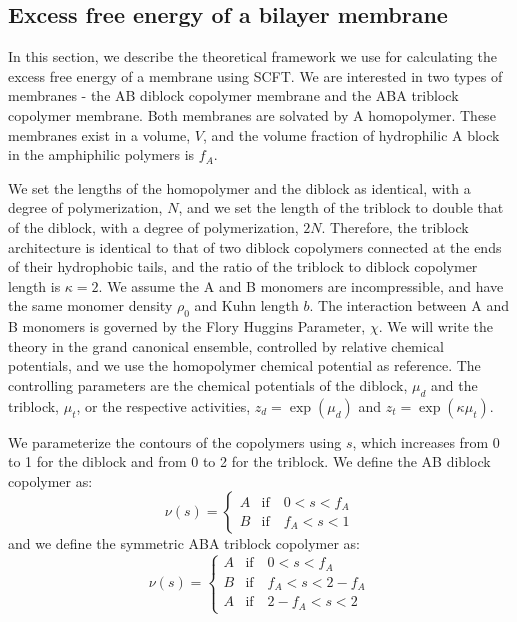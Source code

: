 \documentclass[twocolumn,aps,floatfix,nobibnotes]{revtex4-1}
\begin{document}
\subsection{Excess free energy of a bilayer membrane}
\label{sec:freeE}

In this section, we describe the theoretical framework we use for calculating the excess free energy of a membrane using SCFT. We are interested in two types of membranes - the AB diblock copolymer membrane and the ABA triblock copolymer membrane. Both membranes are solvated by A homopolymer. These membranes exist in a volume, $V$, and the volume fraction of hydrophilic A block in the amphiphilic polymers is $f_A$. 

We set the lengths of the homopolymer and the diblock as identical, with a degree of polymerization, $N$, and we set the length of the triblock to double that of the diblock, with a degree of polymerization, $2N$. Therefore, the triblock architecture is identical to that of two diblock copolymers connected at the ends of their hydrophobic tails, and the ratio of the triblock to diblock copolymer length is $\kappa = 2$. We assume the A and B monomers are incompressible, and have the same monomer density $\rho_0$ and Kuhn length $b$. The interaction between A and B monomers is governed by the Flory Huggins Parameter, $\chi$. We will write the theory in the grand canonical ensemble, controlled by relative chemical potentials, and we use the homopolymer chemical potential as reference. The controlling parameters are the chemical potentials of the diblock, $\mu_d$ and the triblock, $\mu_t$, or the respective activities, $z_d = \exp(\mu_d)$ and $z_t = \exp(\kappa \mu_t)$.

We parameterize the contours of the copolymers using $s$, which increases from 0 to 1 for the diblock and from 0 to 2 for the triblock. We define the AB diblock copolymer as:
\begin{equation} \label{EQ:diblock}
 \nu (s) =  \begin{cases} 
      A & \text{if} \quad 0<s<f_A \\
      B & \text{if} \quad f_A<s<1
   \end{cases}
\end{equation}
and we define the symmetric ABA triblock copolymer as:
\begin{equation} \label{EQ:triblock}
 \nu (s) =  \begin{cases} 
      A & \text{if} \quad 0<s<f_A \\
      B & \text{if} \quad f_A<s< 2-f_A \\
      A & \text{if} \quad 2-f_A<s<2
   \end{cases}
\end{equation}
\end{document}
